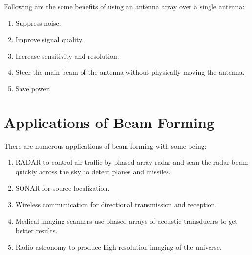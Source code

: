 Following are the some benefits of using an antenna array over a single antenna:
%
\begin{enumerate}
   \item Suppress noise.
   \item Improve signal quality.
   \item Increase sensitivity and resolution.
   \item Steer the main beam of the antenna without physically moving the antenna.
   \item Save power.
\end{enumerate}


\section{Applications of Beam Forming}

There are numerous applications of beam forming with some being:
%
\begin{enumerate}
   \item RADAR to control air traffic by phased array radar and scan the radar beam quickly across the sky to detect planes and missiles.
   \item SONAR for source localization.
   \item Wireless communication for directional transmission and reception.
   \item Medical imaging scanners use phased arrays of acoustic transducers to get better results.
   \item Radio astronomy to produce high resolution imaging of the universe. 
\end{enumerate}

